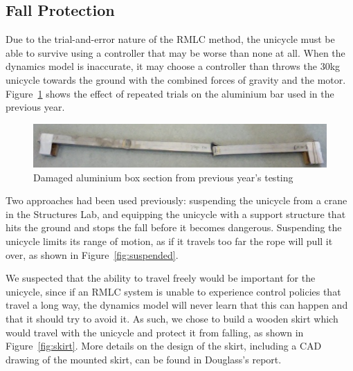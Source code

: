 \documentclass{IIBproject}
\begin{document}
\subsection{Fall Protection}
\label{sec:fall_protection}

Due to the trial-and-error nature of the RMLC method, the unicycle must be
able to survive using a controller that may be worse than none at all. When
the dynamics model is inaccurate, it may choose a controller than throws the
30kg unicycle towards the ground with the combined forces of gravity and the
motor.  Figure~\ref{fig:alu_bar} shows the effect of repeated trials on the
aluminium bar used in the previous year.

\begin{figure}[htpb]
  \begin{center}
    \includegraphics[width=15cm]{alu_bar.jpg}
    \end{center}
    \caption{Damaged aluminium box section from previous year's testing}
    \label{fig:alu_bar}
    \end{figure}

Two approaches had been used previously: suspending the unicycle from a crane
in the Structures Lab, and equipping the unicycle with a support structure
that hits the ground and stops the fall before it becomes dangerous.
Suspending the unicycle limits its range of motion, as if it travels too far
the rope will pull it over, as shown in Figure~\ref{fig:suspended}.

We suspected that the ability to travel freely would be important for the
unicycle, since if an RMLC system is unable to experience control policies
that travel a long way, the dynamics model will never learn that this can
happen and that it should try to avoid it. As such, we chose to build a wooden
skirt which would travel with the unicycle and protect it from falling, as
shown in Figure~\ref{fig:skirt}. More details on the design of the skirt,
including a CAD drawing of the mounted skirt, can be found in Douglass's
report.
\end{document}
